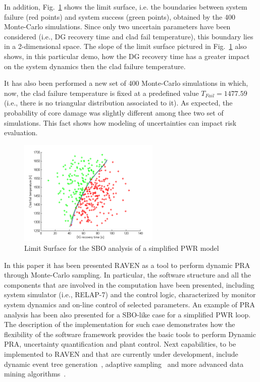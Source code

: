 \documentclass{mc2013}
\begin{document}
In addition, Fig.~\ref{fig:limit_surface_rng_temp_and_dg} shows the limit surface, i.e. the boundaries between system failure (red points) and system success (green points), obtained by the 400 Monte-Carlo simulations. Since only two uncertain parameters have been considered (i.e., DG recovery time and clad fail temperature), this boundary lies in a 2-dimensional space.
The slope of the limit surface pictured in Fig.~\ref{fig:limit_surface_rng_temp_and_dg} also shows, in this particular demo, how the DG recovery time has a greater impact on the system dynamics then the clad failure temperature.

It has also been performed a new set of 400 Monte-Carlo simulations in which, now, the clad failure temperature is fixed at a predefined value $T_{Fail}=1477.59$ (i.e., there is no triangular distribution associated to it). As expected, the probability of core damage was slightly different among thee two set of simulations. This fact shows how modeling of uncertainties can impact risk evaluation.

\begin{figure}
   \centering
    \includegraphics[width=0.6\textwidth]{figures/PRA_limitSurface.png}
    \caption{Limit Surface for the SBO analysis of a simplified PWR model}
    \label{fig:limit_surface_rng_temp_and_dg}
\end{figure}
In this paper it has been presented RAVEN as a tool to perform dynamic PRA through Monte-Carlo sampling. In particular, the software structure and all the components that are involved in the computation have been presented, including system simulator (i.e., RELAP-7) and the control logic, characterized by monitor system dynamics and on-line control of selected parameters.
An example of PRA analysis has been also presented for a SBO-like case for a simplified PWR loop. 
The description of the implementation for such case demonstrates how the flexibility of the software framework provides the basic tools to perform Dynamic PRA, uncertainty quantification and plant control. 
Next capabilities, to be implemented to RAVEN and that are currently under development, include dynamic event tree generation~\cite{ADAPTHakobyan}, adaptive sampling~\cite{mandelliSVMANS} and more advanced data mining algorithms~\cite{mandelliEsrel2011}. 



\end{document}
